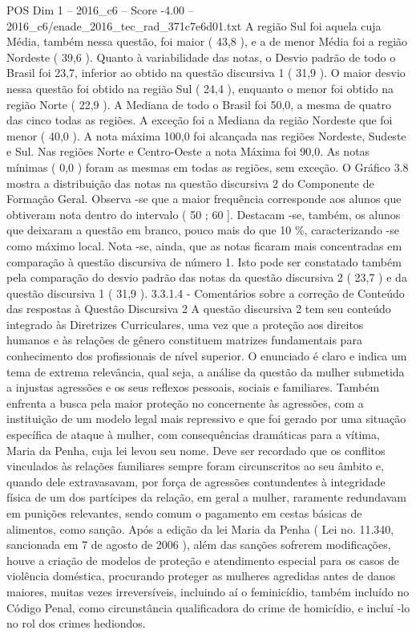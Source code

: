 \begin{textsample}{POS Dim 1 – 2016\_c6 – Score -4.00 – 2016\_c6/enade\_2016\_tec\_rad\_371c7e6d01.txt}
A região Sul foi aquela cuja Média, também nessa questão, foi maior ( 43,8 ), e a de menor Média foi a região Nordeste ( 39,6 ).
Quanto à variabilidade das notas, o Desvio padrão de todo o Brasil foi 23,7, inferior ao obtido na questão discursiva 1 ( 31,9 ).
O maior desvio nessa questão foi obtido na região Sul ( 24,4 ), enquanto o menor foi obtido na região Norte ( 22,9 ).
A Mediana de todo o Brasil foi 50,0, a mesma de quatro das cinco todas as regiões.
A exceção foi a Mediana da região Nordeste que foi menor ( 40,0 ).
A nota máxima 100,0 foi alcançada nas regiões Nordeste, Sudeste e Sul.
Nas regiões Norte e Centro-Oeste a nota Máxima foi 90,0.
As notas mínimas ( 0,0 ) foram as mesmas em todas as regiões, sem exceção.
O Gráfico 3.8 mostra a distribuição das notas na questão discursiva 2 do Componente de Formação Geral.
Observa -se que a maior frequência corresponde aos alunos que obtiveram nota dentro do intervalo ( 50 ; 60 ].
Destacam -se, também, os alunos que deixaram a questão em branco, pouco mais do que 10 \%, caracterizando -se como máximo local.
Nota -se, ainda, que as notas ficaram mais concentradas em comparação à questão discursiva de número 1.
Isto pode ser constatado também pela comparação do desvio padrão das notas da questão discursiva 2 ( 23,7 ) e da questão discursiva 1 ( 31,9 ). 3.3.1.4 - Comentários sobre a correção de Conteúdo das respostas à Questão Discursiva 2 A questão discursiva 2 tem seu conteúdo integrado às Diretrizes Curriculares, uma vez que a proteção aos direitos humanos e às relações de gênero constituem matrizes fundamentais para conhecimento dos profissionais de nível superior.
O enunciado é claro e indica um tema de extrema relevância, qual seja, a análise da questão da mulher submetida a injustas agressões e os seus reflexos pessoais, sociais e familiares.
Também enfrenta a busca pela maior proteção no concernente às agressões, com a instituição de um modelo legal mais repressivo e que foi gerado por uma situação específica de ataque à mulher, com consequências dramáticas para a vítima, Maria da Penha, cuja lei levou seu nome.
Deve ser recordado que os conflitos vinculados às relações familiares sempre foram circunscritos ao seu âmbito e, quando dele extravasavam, por força de agressões contundentes à integridade física de um dos partícipes da relação, em geral a mulher, raramente redundavam em punições relevantes, sendo comum o pagamento em cestas básicas de alimentos, como sanção.
Após a edição da lei Maria da Penha ( Lei no. 11.340, sancionada em 7 de agosto de 2006 ), além das sanções sofrerem modificações, houve a criação de modelos de proteção e atendimento especial para os casos de violência doméstica, procurando proteger as mulheres agredidas antes de danos maiores, muitas vezes irreversíveis, incluindo aí o feminicídio, também incluído no Código Penal, como circunstância qualificadora do crime de homicídio, e incluí -lo no rol dos crimes hediondos.

\end{textsample}

